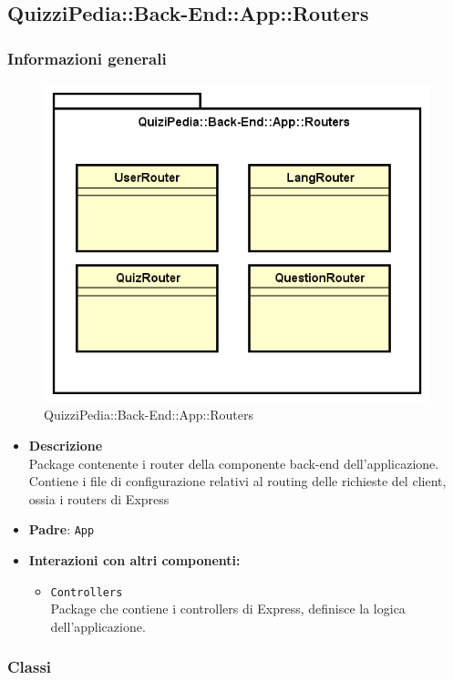 \subsection{QuizziPedia::Back-End::App::Routers}
\subsubsection{Informazioni generali}
\label{QuizziPedia::Back-End::App::Routers}
\begin{figure}
	\centering
	\includegraphics[scale=0.45]{UML/Package/QuizziPedia_Back-End_App_Routers.png}
	\caption{QuizziPedia::Back-End::App::Routers}
\end{figure}
\FloatBarrier
	\begin{itemize}
		\item \textbf{Descrizione} \\
		Package contenente i router della componente back-end dell'applicazione. Contiene i file di configurazione relativi al routing delle richieste del client, ossia i routers di Express
		\item \textbf{Padre}: \texttt{App}
		\item \textbf{Interazioni con altri componenti:}
			\begin{itemize}
				\item \texttt{Controllers} \\
				Package che contiene i controllers di Express, definisce la logica dell'applicazione.
			\end{itemize}
	\end{itemize}
\subsubsection{Classi}





